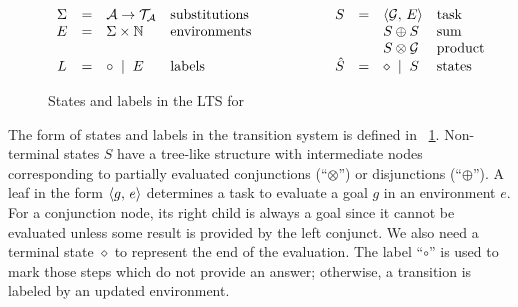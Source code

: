 \begin{figure}[t]
\centering
\[
\begin{array}{ccllcccll}
  \Sigma & = & \mathcal{A} \to \mathcal{T}_\mathcal{A} & \mbox{substitutions} &\qquad\qquad&        S & = & \langle \mathcal{G} ,\, E \rangle & \mbox{task} \\
       E & = & \Sigma \times \mathbb{N}              & \mbox{environments}  &\qquad\qquad&          &   & S \oplus S              & \mbox{sum} \\
         &   &                                       &                      &\qquad\qquad&          &   & S \otimes \mathcal{G}   & \mbox{product} \\
       L & = & \circ \; \mid \; E      & \mbox{labels}        &\qquad\qquad&  \hat{S} & = & \diamond \; \mid \; S   & \mbox{states} \\
\end{array}
\]
\caption{States and labels in the LTS for \mK}
\label{fig:operanional_semantics_states_labels}
\end{figure}

The form of states and labels in the transition system is defined in \figureword~\ref{fig:operanional_semantics_states_labels}.
Non-terminal states $S$ have a tree-like structure with intermediate nodes corresponding to partially evaluated conjunctions
(``$\otimes$'') or disjunctions (``$\oplus$'').
A leaf in the form $\langle g ,\, e \rangle$ determines a task to evaluate a goal $g$ in an environment $e$. For a conjunction node, its right child
is always a goal since it cannot be evaluated unless some result is provided by the left conjunct.
We also need a terminal state $\diamond$ to represent the end of the evaluation.
The label ``$\circ$'' is used to mark those steps which do not provide an answer; otherwise, a transition is labeled by an updated
environment.

